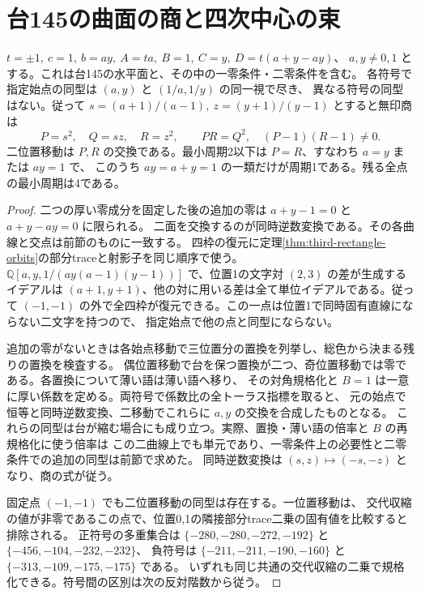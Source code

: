 \section{台145の曲面の商と四次中心の束}
\label{sec:parallel-rectangle-surface}
\begin{theorem}\label{thm:parallel-rectangle-surface}
$t=\pm1,\ c=1,\ b=ay,\ A=ta,\ B=1,\ C=y,\ D=t(a+y-ay)$、
$a,y\ne0,1$ とする。これは台145の水平面と、その中の一零条件・二零条件を含む。
各符号で指定始点の同型は $(a,y)$ と $(1/a,1/y)$ の同一視で尽き、
異なる符号の同型はない。従って $s=(a+1)/(a-1),\ z=(y+1)/(y-1)$ とすると無印商は
\[
 P=s^2,\quad Q=sz,\quad R=z^2,\qquad PR=Q^2,\quad (P-1)(R-1)\ne0 .
\]
二位置移動は $P,R$ の交換である。最小周期2以下は $P=R$、すなわち $a=y$ または $ay=1$ で、
このうち $ay=a+y=1$ の一類だけが周期1である。残る全点の最小周期は4である。
\end{theorem}
\begin{proof}
二つの厚い零成分を固定した後の追加の零は $a+y-1=0$ と $a+y-ay=0$ に限られる。
二面を交換するのが同時逆数変換である。その各曲線と交点は前節のものに一致する。
四枠の復元に定理\ref{thm:third-rectangle-orbits}の部分traceと射影子を同じ順序で使う。
$\mathbb Q[a,y,1/(ay(a-1)(y-1))]$ で、位置1の文字対 $(2,3)$ の差が生成するイデアルは
$(a+1,y+1)$、他の対に用いる差は全て単位イデアルである。従って
$(-1,-1)$ の外で全四枠が復元できる。この一点は位置1で同時固有直線にならない二文字を持つので、
指定始点で他の点と同型にならない。

追加の零がないときは各始点移動で三位置分の置換を列挙し、総色から決まる残りの置換を検査する。
偶位置移動で台を保つ置換が二つ、奇位置移動では零である。各置換について薄い語は薄い語へ移り、
その対角規格化と $B=1$ は一意に厚い係数を定める。両符号で係数比の全トーラス指標を取ると、
元の始点で恒等と同時逆数変換、二移動でこれらに $a,y$ の交換を合成したものとなる。
これらの同型は台が縮む場合にも成り立つ。実際、置換・薄い語の倍率と $B$ の再規格化に使う倍率は
この二曲線上でも単元であり、一零条件上の必要性と二零条件での追加の同型は前節で求めた。
同時逆数変換は $(s,z)\mapsto(-s,-z)$ となり、商の式が従う。

固定点 $(-1,-1)$ でも二位置移動の同型は存在する。一位置移動は、
交代収縮の値が非零であるこの点で、位置0,1の隣接部分trace二乗の固有値を比較すると排除される。
正符号の多重集合は $\{-280,-280,-272,-192\}$ と $\{-456,-104,-232,-232\}$、
負符号は $\{-211,-211,-190,-160\}$ と $\{-313,-109,-175,-175\}$ である。
いずれも同じ共通の交代収縮の二乗で規格化できる。符号間の区別は次の反対階数から従う。
\end{proof}

